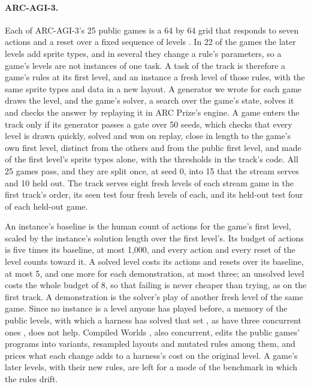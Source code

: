 \paragraph{ARC-AGI-3.} Each of ARC-AGI-3's 25 public games is a 64 by 64 grid that responds to seven actions and a reset over a fixed sequence of levels \citep{arcprize2026arcagi3}. In 22 of the games the later levels add sprite types, and in several they change a rule's parameters, so a game's levels are not instances of one task. A task of the track is therefore a game's rules at its first level, and an instance a fresh level of those rules, with the same sprite types and data in a new layout. A generator we wrote for each game draws the level, and the game's solver, a search over the game's state, solves it and checks the answer by replaying it in ARC Prize's engine. A game enters the track only if its generator passes a gate over 50 seeds, which checks that every level is drawn quickly, solved and won on replay, close in length to the game's own first level, distinct from the others and from the public first level, and made of the first level's sprite types alone, with the thresholds in the track's code. All 25 games pass, and they are split once, at seed 0, into 15 that the stream serves and 10 held out. The track serves eight fresh levels of each stream game in the first track's order, its seen test four fresh levels of each, and its held-out test four of each held-out game.

An instance's baseline is the human count of actions for the game's first level, scaled by the instance's solution length over the first level's. Its budget of actions is five times its baseline, at most 1,000, and every action and every reset of the level counts toward it. A solved level costs its actions and resets over its baseline, at most 5, and one more for each demonstration, at most three; an unsolved level costs the whole budget of 8, so that failing is never cheaper than trying, as on the first track. A demonstration is the solver's play of another fresh level of the same game. Since no instance is a level anyone has played before, a memory of the public levels, with which a harness has solved that set \citep{bedi2026learningmachines}, as have three concurrent ones \citep{wu2026kepler,zhao2026memento3,anonymous2026comate}, does not help. Compiled Worlds \citep{anonymous2026compiledworlds}, also concurrent, edits the public games' programs into variants, resampled layouts and mutated rules among them, and prices what each change adds to a harness's cost on the original level. A game's later levels, with their new rules, are left for a mode of the benchmark in which the rules drift.

